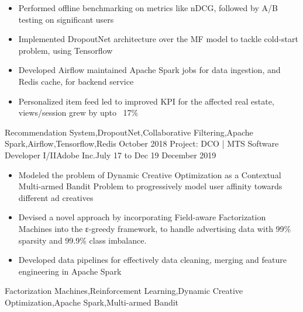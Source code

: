 \begin{experiences}
{\begin{itemize}
                        \item Performed offline benchmarking on metrics like nDCG, followed by A/B testing on significant users
                        \item Implemented DropoutNet architecture over the MF model to tackle cold-start problem, using Tensorflow
                        \item Developed Airflow maintained Apache Spark jobs for data ingestion, and Redis cache, for backend service
                        \item Personalized item feed led to improved KPI for the affected real estate, views/session grew by upto ~17\%
                      \end{itemize}
                    }
                    {Recommendation System,DropoutNet,Collaborative Filtering,Apache Spark,Airflow,Tensorflow,Redis}
  \emptySeparator
  \experience
  {October 2018}  {Project: DCO | MTS Software Developer I/II}{Adobe Inc.}{July 17 to Dec 19}
  {December 2019} {
                    \begin{itemize}
                      \item Modeled the problem of Dynamic Creative Optimization as a Contextual Multi-armed Bandit Problem to progressively model user affinity towards different ad creatives
                      \item Devised a novel approach by incorporating Field-aware Factorization Machines into the ε-greedy framework, to handle advertising data with 99\% sparsity and 99.9\% class imbalance.
                      \item Developed data pipelines for effectively data cleaning, merging and feature engineering in Apache Spark
                    \end{itemize}
                  }
                  {Factorization Machines,Reinforcement Learning,Dynamic Creative Optimization,Apache Spark,Multi-armed Bandit}
\end{experiences}
